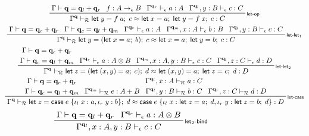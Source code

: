 \documentclass[acmsmall,screen,review]{acmart}
\newcommand{\mc}[1]{\ensuremath{\mathcal{#1}}}
\newcommand{\mb}[1]{\ensuremath{\mathbf{#1}}}
\newcommand{\ms}[1]{\ensuremath{\mathsf{#1}}}
\newcommand{\lto}{:}
\newcommand{\linl}[1]{\iota_l\;{#1}}
\newcommand{\linr}[1]{\iota_r\;{#1}}
\newcommand{\letexpr}[3]{\ensuremath{\ms{let}\;#1 = #2;\;#3}}
\newcommand{\caseexpr}[5]{\ms{case}\;#1\;\{\linl{#2} \lto #3, \linr{#4} \lto #5\}}
\newcommand{\qsp}[4]{#1 \vdash #2 = #3 + #4}
\newcommand{\rle}[1]{{\scriptsize\textsf{#1}}}
\newcommand{\hasty}[4]{#1 \vdash_{#2} #3: {#4}}
\newcommand{\teqv}{\approx}
\newcommand{\tmeq}[5]{#1 \vdash_{#2} #3 \teqv #4 : {#5}}
\begin{document}
\begin{figure}
  \begin{adjustbox}{minipage=1.1\textwidth,scale=0.9}
  \begin{gather*}
    \prftree[r]{\rle{let-op}}
      {\qsp{\Gamma}{\mb{q}}{\mb{q}_l}{\mb{q}_r}}
      {f : A \to_\epsilon B}
      {\hasty{\Gamma^{\mb{q}_r}}{\epsilon}{a}{A}}
      {\hasty{\Gamma^{\mb{q}_l}, y : B}{\epsilon}{c}{C}}
      {\tmeq{\Gamma^{\mb{q}}}{\mc{R}}
        {\letexpr{y}{f\;a}{c}}
        {\letexpr{x}{a}{\letexpr{y}{f\;x}{c}}}
        {C}}
      \\
    \prftree[r]{\rle{let-let$_1$}}
      {\qsp{\Gamma}{\mb{q}}{\mb{q}_c}{\mb{q}_r}}
      {\qsp{\Gamma}{\mb{q}_c}{\mb{q}_l}{\mb{q}_m}}
      {\hasty{\Gamma^{\mb{q}_r}}{\epsilon}{a}{A}}
      {\hasty{\Gamma^{\mb{q}_m}, x : A}{\epsilon}{b}{B}}
      {\hasty{\Gamma^{\mb{q}_l}, y : B}{\epsilon}{c}{C}}
      {
        \tmeq{\Gamma^{\mb{q}}}{\mc{R}}
          {\letexpr{y}{(\letexpr{x}{a}{b})}{c}}
          {\letexpr{x}{a}{\letexpr{y}{b}{c}}}
          {C}
      }
      \\
    \prftree[r]{\rle{let-let$_2$}}
      {
        \prfStackPremises
        {\qsp{\Gamma}{\mb{q}}{\mb{q}_c}{\mb{q}_r}}
        {\qsp{\Gamma}{\mb{q}_c}{\mb{q}_l}{\mb{q}_m}}
      }
      {\hasty{\Gamma^{\mb{q}_r}}{\epsilon}{a}{A \otimes B}}
      {\hasty{\Gamma^{\mb{q}_m}, x : A, y : B}{\epsilon}{c}{C}}
      {\hasty{\Gamma^{\mb{q}_l}, z : C}{\epsilon}{d}{D}}
      {
        \tmeq{\Gamma^{\mb{q}}}{\mc{R}}
          {\letexpr{z}{(\letexpr{(x, y)}{a}{c})}{d}}
          {\letexpr{(x, y)}{a}{\letexpr{z}{c}{d}}}
          {D}
      }
      \\
    \prftree[r]{\rle{let-case}}
      {
        \prfStackPremises
        {\qsp{\Gamma}{\mb{q}}{\mb{q}_c}{\mb{q}_r}}
        {\qsp{\Gamma}{\mb{q}_c}{\mb{q}_l}{\mb{q}_m}}
      }
      {\hasty{\Gamma^{\mb{q}_m}}{\mc{R}}{e}{A + B}}
      {
        \prfStackPremises
        {\hasty{\Gamma^{\mb{q}_l}, x : A}{\mc{R}}{a}{C}}
        {\hasty{\Gamma^{\mb{q}_l}, y : B}{\mc{R}}{b}{C}}
      }
      {
        {\hasty{\Gamma^{\mb{q}_r}, z : C}{\mc{R}}{d}{D}}
      }
      {\tmeq{\Gamma^{\mb{q}}}{\mc{R}}
        {\letexpr{z}{\caseexpr{e}{x}{a}{y}{b}}{d}}
        {\caseexpr{e}{x}{\letexpr{z}{a}{d}}{y}{\letexpr{z}{b}{d}}}
        {D}
      } 
  \end{gather*}
  \begin{gather*}
    \prftree[r]{\rle{let$_2$-bind}}
      {\qsp{\Gamma}{\mb{q}}{\mb{q}_l}{\mb{q}_r}}
      {\hasty{\Gamma^{\mb{q}_r}}{\epsilon}{a}{A \otimes B}}
      {\hasty{\Gamma^{\mb{q}_l}, x : A, y : B}{\epsilon}{c}{C}}

\end{gather*}
\end{adjustbox}
\end{figure}
\end{document}

